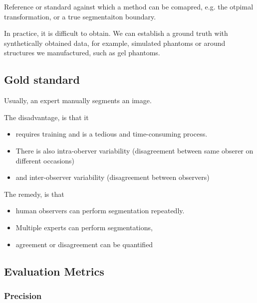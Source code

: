 \documentclass[11pt]{article}
\begin{document}
\begin{definition}
    Reference or standard against which a method can be comapred, e.g. the otpimal transformation, or a true segmentaiton boundary.
\end{definition}

In practice, it is difficult to obtain. We can establish a ground truth with synthetically obtained data, for example, simulated phantoms or around structures we manufactured, such as gel phantoms.

\subsection{Gold standard}

Usually, an expert manually segments an image.

The disadvantage, is that it 

\begin{itemize}
    \item requires training and is a tedious and time-consuming process. 
    \item There is also intra-oberver variability (disagreement between same obserer on different occasions) 
    \item and inter-observer variability (disagreement between observers)
\end{itemize}

The remedy, is that

\begin{itemize}
    \item human observers can perform segmentation repeatedly. 
    \item Multiple experts can perform segmentations, 
    \item agreement or disagreement can be quantified 
\end{itemize}

\subsection{Evaluation Metrics}

\subsubsection{Precision}
\end{document}
